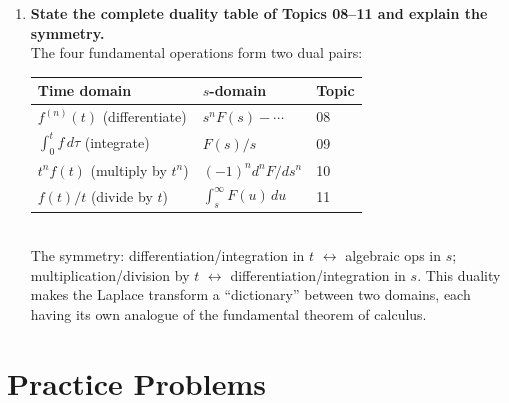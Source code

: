 \documentclass[12pt,a4paper]{article}
\begin{document}
\begin{enumerate}[leftmargin=2em, label=\textbf{D\arabic*.}]
\item \textbf{State the complete duality table of Topics 08--11 and explain the symmetry.}\\
  The four fundamental operations form two dual pairs: \smallskip\\
  \begin{tabular}{@{}lll@{}}
  \toprule
  Time domain & $s$-domain & Topic \\
  \midrule
  $f^{(n)}(t)$ (differentiate) & $s^nF(s)-\cdots$ & 08 \\
  $\int_0^t f\,d\tau$ (integrate) & $F(s)/s$ & 09 \\
  $t^n f(t)$ (multiply by $t^n$) & $(-1)^n d^n F/ds^n$ & 10 \\
  $f(t)/t$ (divide by $t$) & $\int_s^\infty F(u)\,du$ & 11 \\
  \bottomrule
  \end{tabular}\smallskip\\
  The symmetry: differentiation/integration in $t$ $\leftrightarrow$ algebraic ops in $s$;
  multiplication/division by $t$ $\leftrightarrow$ differentiation/integration in $s$.
  This duality makes the Laplace transform a ``dictionary'' between two
  domains, each having its own analogue of the fundamental theorem of calculus.

\end{enumerate}

\section{Practice Problems}
\end{document}

